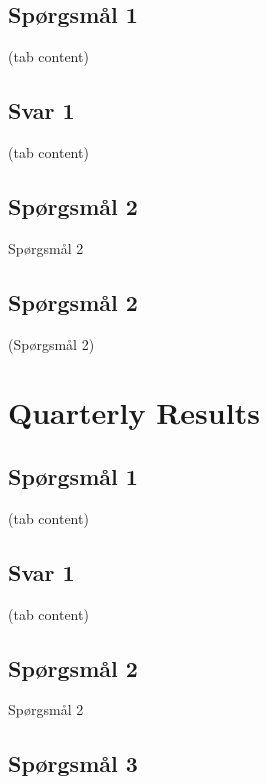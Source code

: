 \documentclass[]{book}
\theoremstyle{definition}
\theoremstyle{definition}
\theoremstyle{definition}
\theoremstyle{remark}
\begin{document}
\hypertarget{sprgsmal-1}{%
\subsection{Spørgsmål 1}\label{sprgsmal-1}}

(tab content)

\hypertarget{svar-1}{%
\subsection{Svar 1}\label{svar-1}}

(tab content)

\hypertarget{sprgsmal-2}{%
\subsection{Spørgsmål 2}\label{sprgsmal-2}}

Spørgsmål 2

\hypertarget{sprgsmal-2-1}{%
\subsection{Spørgsmål 2}\label{sprgsmal-2-1}}

(Spørgsmål 2)

\hypertarget{quarterly-results}{%
\section{Quarterly Results}\label{quarterly-results}}

\hypertarget{sprgsmal-1-1}{%
\subsection{Spørgsmål 1}\label{sprgsmal-1-1}}

(tab content)

\hypertarget{svar-1-1}{%
\subsection{Svar 1}\label{svar-1-1}}

(tab content)

\hypertarget{sprgsmal-2-2}{%
\subsection{Spørgsmål 2}\label{sprgsmal-2-2}}

Spørgsmål 2

\hypertarget{sprgsmal-3}{%
\subsection{Spørgsmål 3}\label{sprgsmal-3}}
\end{document}
